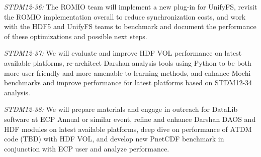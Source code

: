 \emph{STDM12-36:} The ROMIO team will implement a new plug-in for
UnifyFS, revisit the ROMIO implementation overall to reduce
synchronization costs, and work with the HDF5 and UnifyFS teams to
benchmark and document the performance of these optimizations and
possible next steps.

\emph{STDM12-37:} We will evaluate and improve HDF VOL performance
on latest available platforms, re-architect Darshan analysis tools
using Python to be both more user friendly and more amenable to
learning methods, and enhance Mochi benchmarks and improve performance
for latest platforms based on STDM12-34 analysis.

\emph{STDM12-38:}
We will prepare materials and engage in outreach for DataLib software
at ECP Annual or similar event, refine and enhance Darshan
DAOS and HDF modules on latest available platforms, deep dive
on performance of ATDM code (TBD) with HDF VOL, and develop
new PnetCDF benchmark in conjunction with ECP user and analyze performance.


